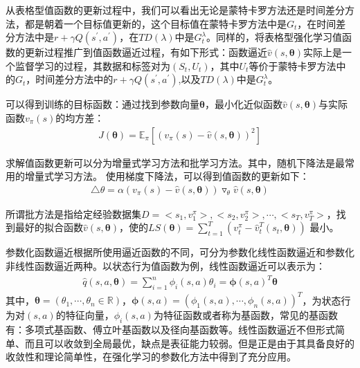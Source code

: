 从表格型值函数的更新过程中，我们可以看出无论是蒙特卡罗方法还是时间差分方法，都是朝着一个目标值更新的，这个目标值在蒙特卡罗方法中是$G_{t}$，在时间差分方法中是$r+\gamma Q(s^{'},a^{'})$，在$TD(\lambda)$中是$G^{\lambda}_{t}$。同样的，将表格型强化学习值函数的更新过程推广到值函数逼近过程，有如下形式：函数逼近$\hat{v}(s,\mathbf{\theta})$实际上是一个监督学习的过程，其数据和标签对为$(S_{t}, U_{t})$，其中$U_{t}$等价于蒙特卡罗方法中的$G_{t}$，时间差分方法中的$r+\gamma Q(s^{'},a^{'})$,以及$TD(\lambda)$中是$G^{\lambda}_{t}$。

可以得到训练的目标函数：通过找到参数向量$\mathbf{\theta}$，最小化近似函数$\hat{v}(s,\mathbf{\theta})$与实际函数$v_{\pi}(s)$的均方差：
\begin{equation}
\begin{aligned}
J(\mathbf{\theta})=\mathbb{E}_{\pi}[(v_{\pi}(s)-\hat{v}(s,\mathbf{\theta}))^2]
\end{aligned}
\end{equation}

求解值函数更新可以分为增量式学习方法和批学习方法。其中，随机下降法是最常用的增量式学习方法。
使用梯度下降法，可以得到值函数的更新如下：
\begin{equation}
\begin{aligned}
\triangle \theta = \alpha (v_{\pi}(s)-\hat{v}(s,\mathbf{\theta})) \triangledown_{\theta} \hat{v}(s,\mathbf{\theta})
\end{aligned}
\end{equation}

所谓批方法是指给定经验数据集$D={<s_{1},v^{\pi}_{1}>,<s_{2},v^{\pi}_{2}>,\cdots,<s_{T},v^{\pi}_{T}>}$，找到最好的拟合函数$\hat{v}(s,\mathbf{\theta})$，使的$LS(\mathbf{\theta})=\sum_{t=1}^{T}(v^{\pi}_{t}-\hat{v}^{T}_{t}(s_{t},\mathbf{\theta}))$ 最小。

参数化函数逼近根据所使用逼近函数的不同，可分为参数化线性函数逼近和参数化非线性函数逼近两种。以状态行为值函数为例，线性函数逼近可以表示为：
\begin{displaymath}
\begin{aligned}
\hat{q}(s,a,\mathbf{\theta})=\sum^{n}_{i=1}\phi_{i}(s,a)\theta_{i}=\mathbf{\phi }(s,a)^{T}\mathbf{\theta }
\end{aligned}
\end{displaymath}
其中，$\mathbf{\theta}=(\theta_{1},\cdots,\theta_{n}\in\mathbb{R})$，$\mathbf{\phi}(s,a)=(\phi_{1}(s,a),\cdots,\phi_{n}(s,a))^{T}$，为状态行为对$(s,a)$的特征向量，$\phi_{i}(s,a)$为特征函数或者称为基函数，常见的基函数有：多项式基函数、傅立叶基函数以及径向基函数等。线性函数逼近不但形式简单、而且可以收敛到全局最优，缺点是表征能力较弱。但是正是由于其具备良好的收敛性和理论简单性，在强化学习的参数化方法中得到了充分应用。

